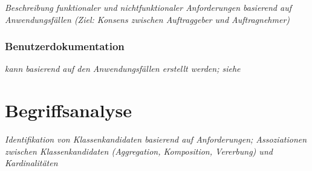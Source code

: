 {\em Beschreibung funktionaler und nichtfunktionaler Anforderungen basierend
auf Anwendungsf\"allen (Ziel: Konsens zwischen Auftraggeber und Auftragnehmer)}

\subsubsection{Benutzerdokumentation}

{\em kann basierend auf den Anwendungsf\"allen erstellt werden; siehe
}

\section{Begriffsanalyse}

{\em Identifikation von Klassenkandidaten basierend auf Anforderungen;
Assoziationen zwischen Klassenkandidaten (Aggregation, Komposition, Vererbung)
und Kardinalit\"aten}


